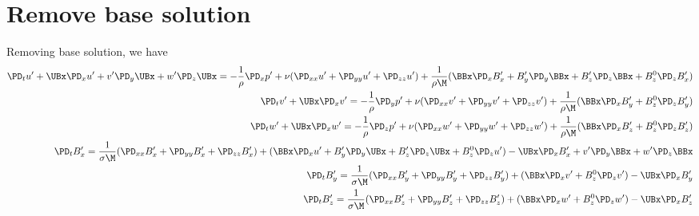 \documentclass[11pt]{article}
\begin{document}
\section{Remove base solution}
Removing base solution, we have
\begin{equation}\begin{aligned}
\PD_t u'+ \UBx\PD_x u' + v'\PD_y \UBx  + w'\PD_z \UBx = -\frac{1}{\rho}\PD_x p'+ \nu (\PD_{xx} u'+\PD_{yy} u'+\PD_{zz} u') + \frac{1}{\rho \M} (\BBx \PD_x B_x' + B_y' \PD_y \BBx + B_z' \PD_z \BBx + B_z^0 \PD_z B_x' ) \\
\PD_t v'+ \UBx\PD_x v'                                = -\frac{1}{\rho}\PD_y p'+ \nu (\PD_{xx} v'+\PD_{yy} v'+\PD_{zz} v') + \frac{1}{\rho \M} (\BBx \PD_x B_y' + B_z^0 \PD_z B_y') \\
\PD_t w'+ \UBx\PD_x w'                                = -\frac{1}{\rho}\PD_z p'+ \nu (\PD_{xx} w'+\PD_{yy} w'+\PD_{zz} w') + \frac{1}{\rho \M} (\BBx \PD_x B_z' + B_z^0 \PD_z B_z') \\
\PD_t B_x' = \frac{1}{\sigma \M} (\PD_{xx} B_x' + \PD_{yy} B_x'+\PD_{zz} B_x') + (\BBx \PD_x u'+B_y'\PD_y \UBx +B_z'\PD_z \UBx +B_z^0 \PD_z u') - \UBx\PD_x B_x'+v'\PD_y \BBx +w'\PD_z \BBx \\
\PD_t B_y' = \frac{1}{\sigma \M} (\PD_{xx} B_y' + \PD_{yy} B_y'+\PD_{zz} B_y') + (\BBx \PD_x v'                +                B_z^0 \PD_z v')         - \UBx\PD_x B_y'                            \\
\PD_t B_z' = \frac{1}{\sigma \M} (\PD_{xx} B_z' + \PD_{yy} B_z'+\PD_{zz} B_z') + (\BBx \PD_x w'                +                B_z^0 \PD_z w')         - \UBx\PD_x B_z'                            \\
\end{aligned} \end{equation}
\end{document}
